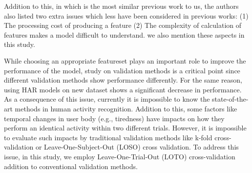 \documentclass[journal,article,submit,moreauthors,pdftex]{Definitions/mdpi}
\begin{document}
%
Addition to this, in \cite{rosati2018comparison} which is the most similar previous work to us, the authors also listed two extra issues which less have been considered in previous works:
(1) The processing cost of producing a feature
(2) The complexity of calculation of features makes a model difficult to understand.
we also mention these aspects in this study.

While choosing an appropriate featureset plays an important role to improve the performance of the model, study on validation methods is a critical point since different validation methods show performance differently. For the same reason, using HAR models on new dataset shows a significant decrease in performance. As a consequence of this issue, currently it is impossible to know the state-of-the-art methods in human activity recognition\cite{jordao2018human}. Addition to this, some factors like temporal changes in user body (e.g., tiredness) have impacts on how they perform an identical activity within two different trials. However, it is impossible to evaluate such impacts by traditional validation methods like k-fold cross-validation or Leave-One-Subject-Out (LOSO) cross validation. To address this issue, in this study, we employ Leave-One-Trial-Out (LOTO) cross-validation addition to conventional validation methods.\\
\end{document}
